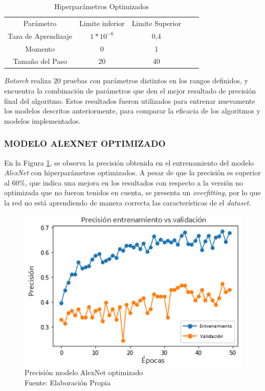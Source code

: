 \begin{table}[ht]
	\centering
	\begin{tabular}{|c|c|c|ll}
		\cline{1-3}
		Parámetro & Limite inferior              & Limite Superior &  &  \\ \cline{1-3}
		Taza de Aprendizaje        & $1*10^{-6}$ & 0,4             &  &  \\ \cline{1-3}
		Momento   & 0                            & 1               &  &  \\ \cline{1-3}
		Tamaño del Paso   & 20                           & 40              &  &  \\ \cline{1-3}
	\end{tabular}
	\caption{Hiperparámetros Optimizados}
	\label{paraopt}
\end{table}

\textit{Botorch} realiza $20$ pruebas con parámetros distintos en los rangos definidos, y encuentra la combinación de parámetros que den el mejor resultado de precisión final del algoritmo. Estos resultados fueron utilizados para entrenar nuevamente los modelos descritos anteriormente, para comparar la eficacia de los algoritmos y modelos implementados.
	
\subsubsection{\MakeUppercase{Modelo AlexNet optimizado}}

En la Figura \ref{fig:preci_Alex_OPT}, se observa la precisión obtenida en el entrenamiento del modelo \textit{AlexNet} con hiperparámetros optimizados. A pesar de que la precisión es superior al $60\%$, que indica una mejora en los resultados con respecto a la versión no optimizada que no fueron tenidos en cuenta, se presenta un \textit{overfitting}, por lo que la red no está aprendiendo de manera correcta las características de el \textit{dataset}.

\begin{figure}[ht]
	\centering
	\includegraphics[scale=0.7]{Figs/500.png}
	\caption{Precisión modelo AlexNet optimizado\\ Fuente: Elaboración Propia}
	\label{fig:preci_Alex_OPT}
\end{figure}

